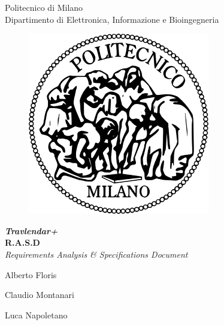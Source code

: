 \thispagestyle{empty}
\begin{center}

	\Huge Politecnico di Milano \\
    \Large Dipartimento di Elettronica, Informazione e Bioingegneria
    
    \vspace{30pt}
    
      \begin{figure}[h]
      	\centering
        \includegraphics[scale=0.5]{Pictures/logo.png}
      \end{figure}
    
    \vspace{30pt}
    
    \Huge \textbf{\emph{Travlendar+}} \\
    \vspace{10pt}
    \huge \textbf{R.A.S.D} \\
    \Large \emph{Requirements Analysis \& Specifications Document} \\
    
    \vspace{100pt}
    
    \large Alberto Floris \\
    
    \vspace{5pt}
    
    \large Claudio Montanari \\
    
    \vspace{5pt}
    
    \large Luca Napoletano
    
    
\end{center}